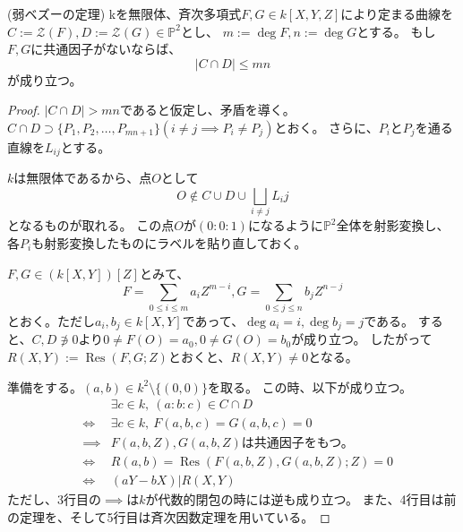 \documentclass[a4]{article}
\newcommand{\proj}{\mathbb{P}}
\newcommand{\Res}{\operatorname{Res}}
\begin{document}
        \begin{Prop}(弱ベズーの定理)
            kを無限体、斉次多項式$F,G \in k[X,Y,Z]$により定まる曲線を
            $C:=\mathcal{Z}(F), D:=\mathcal{Z}(G) \in \proj^2$とし、
            $m:=\deg F, n:=\deg G$とする。
            もし$F,G$に共通因子がないならば、
            \[ |C \cap D| \leq mn \]
            が成り立つ。
        \end{Prop}
        \begin{proof}
            $|C \cap D|>mn$であると仮定し、矛盾を導く。
            $C \cap D \supset \{ P_1, P_2, \dots, P_{mn+1} \}(i \neq j \implies P_i \neq P_j)$とおく。
            さらに、$P_i$と$P_j$を通る直線を$L_{ij}$とする。

            $k$は無限体であるから、点$O$として
            \[ O \not \in C \cup D \cup \bigsqcup_{i \neq j}{L_ij} \]
            となるものが取れる。
            この点$O$が$(0:0:1)$になるように$\proj^2$全体を射影変換し、
            各$P_i$も射影変換したものにラベルを貼り直しておく。

            $F,G \in (k[X, Y])[Z]$とみて、
            \[ F=\sum_{0 \leq i \leq m}{a_{i} Z^{m-i}}, G=\sum_{0 \leq j \leq n}{b_{j} Z^{n-j}} \]
            とおく。ただし$a_i, b_j \in k[X, Y]$であって、$\deg a_i=i, \deg b_j=j$である。
            すると、$C,D \not \ni 0$より$0 \neq F(O)=a_0, 0 \neq G(O)=b_0$が成り立つ。
            したがって$R(X, Y):=\Res(F,G; Z)$とおくと、$R(X,Y) \neq 0$となる。

            準備をする。$(a,b) \in k^2 \setminus \{ (0,0) \}$を取る。
            この時、以下が成り立つ。
            \begin{eqnarray*}
                &{}& \exists c \in k,~ (a:b:c) \in C \cap D \\
                &\iff& \exists c \in k,~ F(a,b,c)=G(a,b,c)=0 \\
                &\implies& F(a,b,Z), G(a,b,Z)\mbox{は共通因子をもつ。} \\
                &\iff& R(a,b)=\Res ( F(a,b,Z), G(a,b,Z); Z )=0 \\
                &\iff& (aY-bX) | R(X,Y)
            \end{eqnarray*}
            ただし、3行目の$\implies$は$k$が代数的閉包の時には逆も成り立つ。
            また、4行目は前の定理を、そして5行目は斉次因数定理を用いている。
            

\end{proof}
\end{document}
